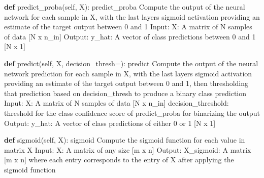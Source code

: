 \documentclass[
  letterpaper,
  DIV=11,
  numbers=noendperiod]{scrartcl}
\newenvironment{Shaded}{\begin{snugshade}}{\end{snugshade}}
\newcommand{\CommentTok}[1]{\textcolor[rgb]{0.37,0.37,0.37}{#1}}
\newcommand{\KeywordTok}[1]{\textcolor[rgb]{0.00,0.23,0.31}{\textbf{#1}}}
\newcommand{\NormalTok}[1]{\textcolor[rgb]{0.00,0.23,0.31}{#1}}
\newcommand{\OperatorTok}[1]{\textcolor[rgb]{0.37,0.37,0.37}{#1}}
\newcommand{\VariableTok}[1]{\textcolor[rgb]{0.07,0.07,0.07}{#1}}
\begin{document}
\begin{Shaded}
\begin{Highlighting}[]
    \KeywordTok{def}\NormalTok{ predict\_proba(}\VariableTok{self}\NormalTok{, X):}
        \CommentTok{\textquotesingle{}\textquotesingle{}\textquotesingle{}predict\_proba}
\CommentTok{        Compute the output of the neural network for each sample in X, with the }
\CommentTok{        last layer\textquotesingle{}s sigmoid activation providing an estimate of the target }
\CommentTok{        output between 0 and 1}
\CommentTok{            Input:}
\CommentTok{                X: A matrix of N samples of data [N x n\_in]}
\CommentTok{            Output:}
\CommentTok{                y\_hat: A vector of class predictions between 0 and 1 [N x 1]}
\CommentTok{        \textquotesingle{}\textquotesingle{}\textquotesingle{}}
    
    \KeywordTok{def}\NormalTok{ predict(}\VariableTok{self}\NormalTok{, X, decision\_thresh}\OperatorTok{=}\NormalTok{):}
        \CommentTok{\textquotesingle{}\textquotesingle{}\textquotesingle{}predict}
\CommentTok{        Compute the output of the neural network prediction for }
\CommentTok{        each sample in X, with the last layer\textquotesingle{}s sigmoid activation }
\CommentTok{        providing an estimate of the target output between 0 and 1, }
\CommentTok{        then thresholding that prediction based on decision\_thresh}
\CommentTok{        to produce a binary class prediction}
\CommentTok{            Input:}
\CommentTok{                X: A matrix of N samples of data [N x n\_in]}
\CommentTok{                decision\_threshold: threshold for the class confidence score}
\CommentTok{                                    of predict\_proba for binarizing the output}
\CommentTok{            Output:}
\CommentTok{                y\_hat: A vector of class predictions of either 0 or 1 [N x 1]}
\CommentTok{        \textquotesingle{}\textquotesingle{}\textquotesingle{}}
    
    \KeywordTok{def}\NormalTok{ sigmoid(}\VariableTok{self}\NormalTok{, X):}
        \CommentTok{\textquotesingle{}\textquotesingle{}\textquotesingle{}sigmoid}
\CommentTok{        Compute the sigmoid function for each value in matrix X}
\CommentTok{            Input:}
\CommentTok{                X: A matrix of any size [m x n]}
\CommentTok{            Output:}
\CommentTok{                X\_sigmoid: A matrix [m x n] where each entry corresponds to the}
\CommentTok{                           entry of X after applying the sigmoid function}
\CommentTok{        \textquotesingle{}\textquotesingle{}\textquotesingle{}}
    

\end{Highlighting}
\end{Shaded}
\end{document}
